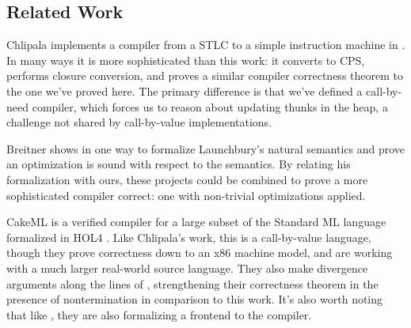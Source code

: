 \subsection{Related Work}

Chlipala implements a compiler from a STLC to a simple instruction machine in
\cite{chlipala2007certified}. In many ways it is more sophisticated than this
work: it converts to CPS, performs closure conversion, and proves a similar
compiler correctness theorem to the one we've proved here. The primary
difference is that we've defined a call-by-need compiler, which forces us to
reason about updating thunks in the heap, a challenge not shared by
call-by-value implementations.

Breitner shows in \cite{breitnerthesis} one way to formalize Launchbury's
natural semantics \cite{launchburynatural} and prove an optimization is sound
with respect to the semantics. By relating his formalization with ours, these
projects could be combined to prove a more sophisticated compiler correct: one
with non-trivial optimizations applied.

CakeML \cite{cakeml14} is a verified compiler for a large subset of the Standard
ML language formalized in HOL4 \cite{slind2008brief}. Like Chlipala's work, this
is a call-by-value language, though they prove correctness down to an x86
machine model, and are working with a much larger real-world source language.
They also make divergence arguments along the lines of \cite{functionalbigstep},
strengthening their correctness theorem in the presence of nontermination in
comparison to this work. It's also worth noting that like
\cite{leroy2012compcert}, they are also formalizing a frontend to the compiler. 


